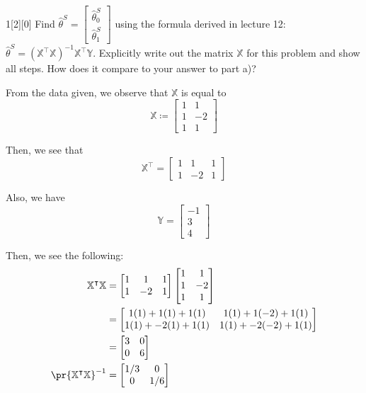 \documentclass{article}
\begin{document}
\begin{dshw}{1}[2][0]
	Find $\hat{\theta}^S = \begin{bmatrix} \hat{\theta}_0^{S} \\ \hat{\theta}_1^{S} \end{bmatrix}$ using the formula derived in lecture 12:
	$\hat{\theta}^S = (\mathbb{X}^{\top} \mathbb{X})^{-1} \mathbb{X}^{\top} \mathbb{Y}$. Explicitly write out the matrix $\mathbb{X}$ for this problem and show all steps. How does it compare to your answer to part a)?
\end{dshw}
\begin{solution}
	From the data given, we observe that $\mathbb X$ is equal to
	\begin{equation*}
		\mathbb X \coloneq \begin{bmatrix}
			1 & 1 \\ 1 & -2 \\ 1 & 1
		\end{bmatrix}
	\end{equation*}

	Then, we see that
	\begin{equation*}
		\mathbb X^{\intercal} = \begin{bmatrix}
			1 & 1 & 1 \\ 1 & -2 & 1
		\end{bmatrix}
	\end{equation*}

	Also, we have
	\begin{equation*}
		\mathbb Y = \begin{bmatrix}
			-1 \\ 3 \\ 4
		\end{bmatrix}
	\end{equation*}

	Then, we see the following:
	\begin{align*}
		\mathbb X^{\intercal} \mathbb X &= \begin{bmatrix}
				1 & 1 & 1 \\ 1 & -2 & 1
			\end{bmatrix}\begin{bmatrix}
			1 & 1 \\ 1 & -2 \\ 1 & 1
		\end{bmatrix} \\
		&= \begin{bmatrix}
			1(1) + 1(1) + 1(1) & 1(1) + 1(-2) + 1(1) \\ 1(1) + -2(1) + 1(1) & 1(1) + -2(-2) + 1(1)
		\end{bmatrix} \\
		&= \begin{bmatrix}
			3 & 0 \\ 0 & 6
		\end{bmatrix} \\
	\pr{\mathbb X^{\intercal} \mathbb X}^{-1} &= \begin{bmatrix}
	1/3 & 0 \\ 0 & 1/6
	\end{bmatrix} \\
	\end{align*}


\end{solution}
\end{document}
